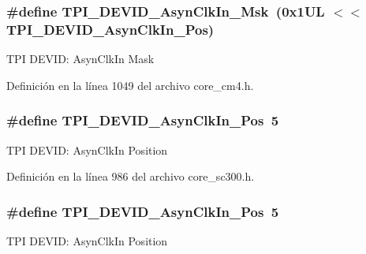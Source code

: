 \subsubsection[{\texorpdfstring{T\+P\+I\+\_\+\+D\+E\+V\+I\+D\+\_\+\+Asyn\+Clk\+In\+\_\+\+Msk}{TPI_DEVID_AsynClkIn_Msk}}]{\setlength{\rightskip}{0pt plus 5cm}\#define T\+P\+I\+\_\+\+D\+E\+V\+I\+D\+\_\+\+Asyn\+Clk\+In\+\_\+\+Msk~(0x1\+U\+L $<$$<$ T\+P\+I\+\_\+\+D\+E\+V\+I\+D\+\_\+\+Asyn\+Clk\+In\+\_\+\+Pos)}\hypertarget{group___c_m_s_i_s___t_p_i_gab67830557d2d10be882284275025a2d3}{}\label{group___c_m_s_i_s___t_p_i_gab67830557d2d10be882284275025a2d3}
T\+PI D\+E\+V\+ID\+: Asyn\+Clk\+In Mask 

Definición en la línea 1049 del archivo core\+\_\+cm4.\+h.

\subsubsection[{\texorpdfstring{T\+P\+I\+\_\+\+D\+E\+V\+I\+D\+\_\+\+Asyn\+Clk\+In\+\_\+\+Pos}{TPI_DEVID_AsynClkIn_Pos}}]{\setlength{\rightskip}{0pt plus 5cm}\#define T\+P\+I\+\_\+\+D\+E\+V\+I\+D\+\_\+\+Asyn\+Clk\+In\+\_\+\+Pos~5}\hypertarget{group___c_m_s_i_s___t_p_i_gab382b1296b5efd057be606eb8f768df8}{}\label{group___c_m_s_i_s___t_p_i_gab382b1296b5efd057be606eb8f768df8}
T\+PI D\+E\+V\+ID\+: Asyn\+Clk\+In Position 

Definición en la línea 986 del archivo core\+\_\+sc300.\+h.

\subsubsection[{\texorpdfstring{T\+P\+I\+\_\+\+D\+E\+V\+I\+D\+\_\+\+Asyn\+Clk\+In\+\_\+\+Pos}{TPI_DEVID_AsynClkIn_Pos}}]{\setlength{\rightskip}{0pt plus 5cm}\#define T\+P\+I\+\_\+\+D\+E\+V\+I\+D\+\_\+\+Asyn\+Clk\+In\+\_\+\+Pos~5}\hypertarget{group___c_m_s_i_s___t_p_i_gab382b1296b5efd057be606eb8f768df8}{}\label{group___c_m_s_i_s___t_p_i_gab382b1296b5efd057be606eb8f768df8}
T\+PI D\+E\+V\+ID\+: Asyn\+Clk\+In Position 

